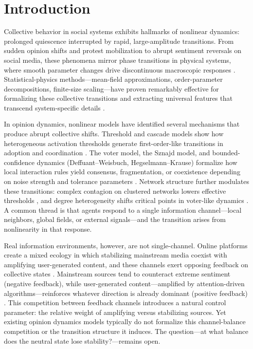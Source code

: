 \documentclass[preprint,12pt]{elsarticle}
\begin{document}
\linenumbers

\section{Introduction}
\label{sec:introduction}

Collective behavior in social systems exhibits hallmarks of nonlinear dynamics: prolonged quiescence interrupted by rapid, large-amplitude transitions. From sudden opinion shifts and protest mobilization to abrupt sentiment reversals on social media, these phenomena mirror phase transitions in physical systems, where smooth parameter changes drive discontinuous macroscopic responses \cite{Castellano2009,Baronchelli2018,PastorSatorras2015}. Statistical-physics methods---mean-field approximations, order-parameter decompositions, finite-size scaling---have proven remarkably effective for formalizing these collective transitions and extracting universal features that transcend system-specific details \cite{Watts2002,Centola2010}.

In opinion dynamics, nonlinear models have identified several mechanisms that produce abrupt collective shifts. Threshold and cascade models show how heterogeneous activation thresholds generate first-order-like transitions in adoption and coordination \cite{Granovetter1978,CentolaMacy2007,WattsDodds2007,Nyborg2016}. The voter model, the Sznajd model, and bounded-confidence dynamics (Deffuant--Weisbuch, Hegselmann--Krause) formalize how local interaction rules yield consensus, fragmentation, or coexistence depending on noise strength and tolerance parameters \cite{HolleyLiggett1975,SoodRedner2005,Deffuant2000,HegselmannKrause2002}. Network structure further modulates these transitions: complex contagion on clustered networks lowers effective thresholds \cite{Centola2010,Centola2018Tipping,Iacopini2019}, and degree heterogeneity shifts critical points in voter-like dynamics \cite{PastorSatorras2015}. A common thread is that agents respond to a single information channel---local neighbors, global fields, or external signals---and the transition arises from nonlinearity in that response.

Real information environments, however, are not single-channel. Online platforms create a mixed ecology in which stabilizing mainstream media coexist with amplifying user-generated content, and these channels exert opposing feedback on collective states \cite{Chadwick2017,Bakshy2015}. Mainstream sources tend to counteract extreme sentiment (negative feedback), while user-generated content---amplified by attention-driven algorithms---reinforces whatever direction is already dominant (positive feedback) \cite{DelVicario2016SciRep,Vosoughi2018,Piao2023,Tornberg2022,Cinelli2021}. This competition between feedback channels introduces a natural control parameter: the relative weight of amplifying versus stabilizing sources. Yet existing opinion dynamics models typically do not formalize this channel-balance competition or the transition structure it induces. The question---at what balance does the neutral state lose stability?---remains open.
\end{document}
